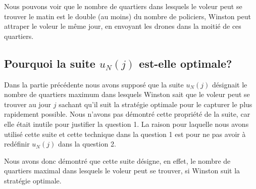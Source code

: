 \medskip

Nous pouvons voir que le nombre de quartiers dans lesquels le voleur peut se trouver le matin est le double (au moins) du nombre de policiers, Winston peut attraper le voleur le même jour, en envoyant les drones dans la moitié de ces quartiers.

\subsection{Pourquoi la suite $u_N(j)$ est-elle optimale?}

Dans la partie précédente nous avons supposé que la suite $u_N(j)$ désignait le nombre de quartiers maximum dans lesquels Winston sait que le voleur peut se trouver au jour $j$ sachant qu'il suit la stratégie optimale pour le capturer le plus rapidement possible. Nous n'avons pas démontré cette propriété de la suite, car elle était inutile pour justifier la question 1. La raison pour laquelle nous avons utilisé cette suite et cette technique dans la question 1 est pour ne pas avoir à redéfinir $u_N(j)$ dans la question 2.

\medskip

Nous avons donc démontré que cette suite désigne, en effet, le nombre de quartiers maximal dans lesquels le voleur peut se trouver, si Winston suit la stratégie optimale.

\hspace{1cm}

